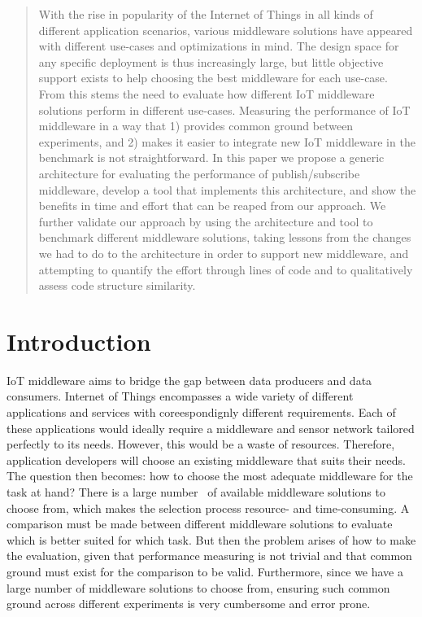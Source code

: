 \documentclass[conference]{IEEEtran}
\begin{document}
\begin{abstract}
  With the rise in popularity of the Internet of Things in all kinds of different application scenarios, various middleware solutions have appeared with different use-cases and optimizations in mind. The design space for any specific deployment is thus increasingly large, but little objective support exists to help choosing the best middleware for each use-case. From this stems the need to evaluate how different IoT middleware solutions perform in different use-cases. Measuring the performance of IoT middleware in a way that 1) provides common ground between experiments, and 2) makes it easier to integrate new IoT middleware in the benchmark is not straightforward. In this paper we propose a generic architecture for evaluating the performance of publish/subscribe middleware, develop a tool that implements this architecture, and show the benefits in time and effort that can be reaped from our approach. We further validate our approach by using the architecture and tool to benchmark different middleware solutions, taking lessons from the changes we had to do to the architecture in order to support new middleware, and attempting to quantify the effort through lines of code and to qualitatively assess code structure similarity. 
\end{abstract}

\section{Introduction}

IoT middleware aims to bridge the gap between data producers and data consumers. Internet of Things encompasses a wide variety of different applications and services with coreespondignly different requirements. Each of these applications would ideally require a middleware and sensor network tailored perfectly to its needs. However, this would be a waste of resources. Therefore, application developers will choose an existing middleware that suits their needs. The question then becomes: how to choose the most adequate middleware for the task at hand? There is a large number~\cite{razzaque_middleware_2016} of available middleware solutions to choose from, which makes the selection process resource- and time-consuming. A comparison must be made between different middleware solutions to evaluate which is better suited for which task. But then the problem arises of how to make the evaluation, given that performance measuring is not trivial and that common ground must exist for the comparison to be valid. Furthermore, since we have a large number of middleware solutions to choose from, ensuring such common ground across different experiments is very cumbersome and error prone. 
\end{document}
